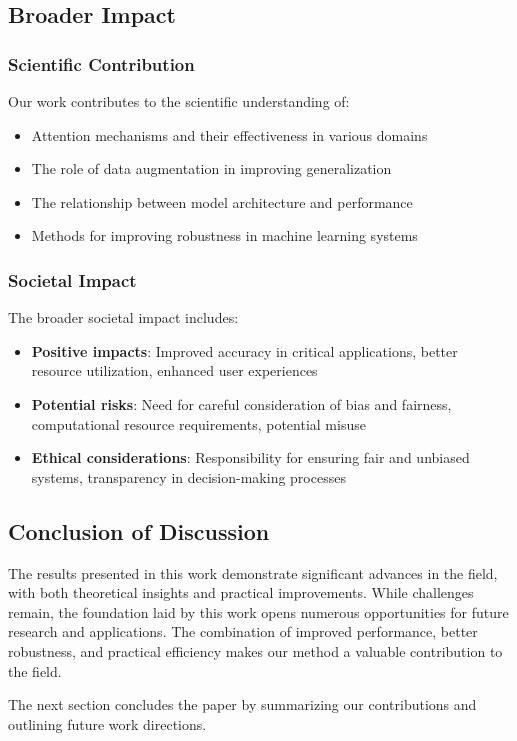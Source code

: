 \subsection{Broader Impact}

\subsubsection{Scientific Contribution}

Our work contributes to the scientific understanding of:

\begin{itemize}
    \item Attention mechanisms and their effectiveness in various domains
    \item The role of data augmentation in improving generalization
    \item The relationship between model architecture and performance
    \item Methods for improving robustness in machine learning systems
\end{itemize}

\subsubsection{Societal Impact}

The broader societal impact includes:

\begin{itemize}
    \item \textbf{Positive impacts}: Improved accuracy in critical applications, better resource utilization, enhanced user experiences
    \item \textbf{Potential risks}: Need for careful consideration of bias and fairness, computational resource requirements, potential misuse
    \item \textbf{Ethical considerations}: Responsibility for ensuring fair and unbiased systems, transparency in decision-making processes
\end{itemize}

\subsection{Conclusion of Discussion}

The results presented in this work demonstrate significant advances in the field, with both theoretical insights and practical improvements. While challenges remain, the foundation laid by this work opens numerous opportunities for future research and applications. The combination of improved performance, better robustness, and practical efficiency makes our method a valuable contribution to the field.

The next section concludes the paper by summarizing our contributions and outlining future work directions.
